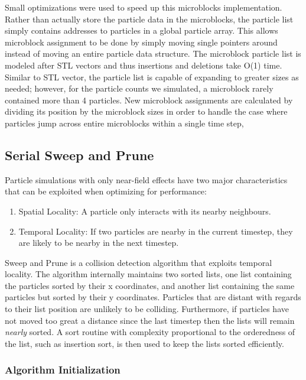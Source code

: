 \documentclass[11pt]{article} %
\begin{document}
Small optimizations were used to speed up this microblocks implementation. Rather than actually store the particle data in the microblocks, the particle list simply contains addresses to particles in a global particle array. This allows microblock assignment to be done by simply moving single pointers around instead of moving an entire particle data structure. The microblock particle list is modeled after STL vectors and thus insertions and deletions take O(1) time. Similar to STL vector, the particle list is capable of expanding to greater sizes as needed; however, for the particle counts we simulated, a microblock rarely contained more than 4 particles. New microblock assignments are calculated by dividing its position by the microblock sizes in order to handle the case where particles jump across entire microblocks within a single time step,

\subsection{Serial Sweep and Prune}

Particle simulations with only near-field effects have two major characteristics
that can be exploited when optimizing for performance:
\begin{enumerate}
\item Spatial Locality: A particle only interacts with its nearby neighbours.
\item Temporal Locality: If two particles are nearby in the current timestep,
they are likely to be nearby in the next timestep.
\end{enumerate}
Sweep and Prune is a collision detection algorithm that exploits temporal
locality. The algorithm internally maintains two sorted lists, one
list containing the particles sorted by their x coordinates, and another
list containing the same particles but sorted by their y coordinates.
Particles that are distant with regards to their list position are
unlikely to be colliding. Furthermore, if particles have not moved
too great a distance since the last timestep then the lists will remain
\emph{nearly} sorted. A sort routine with complexity proportional
to the orderedness of the list, such as insertion sort, is then used
to keep the lists sorted efficiently. 

\subsubsection{Algorithm Initialization}
\end{document}
